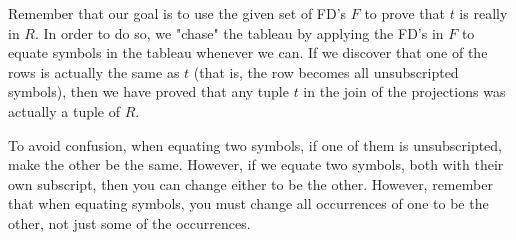   Remember that our goal is to use the given set of FD's $F$ to prove that $t$ is really in $R$. In order to do so, we "chase" the tableau by applying the FD's in $F$ to equate symbols in the tableau whenever we can. If we discover that one of the rows is actually the same as $t$ (that is, the row becomes all unsubscripted symbols), then we have proved that any tuple $t$ in the join of the projections was actually a tuple of $R$.

  To avoid confusion, when equating two symbols, if one of them is unsubscripted, make the other be the same. However, if we equate two symbols, both with their own subscript, then you can change either to be the other. However, remember that when equating symbols, you must change all occurrences of one to be the other, not just some of the occurrences.


